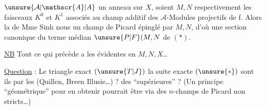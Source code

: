 
\uline{}\unsure{:|,}  $\unsure{\mathcal{A}|\mathscr{A}|A}$ un anneau sur $X$, soient $M,N$ respectivement les faisceaux $K^{0}$ et $K^{1}$ associés au champ additif des $\mathcal{A}$-Modules projectifs de  f.  Alors la  de Mme Sinh nous  un champ de Picard épinglé par $M,N$, d'où une section  canonique du terme médian $\unsure{P|F}(M,N$ de $(*)$.

\uline{NB} Tout ce qui précède a les  évidentes en $M,N,X$\ldots

\uline{Question} : Le triangle exact $(\unsure{T|J})$  la suite exacte $(\unsure{*})$ sont ils  par les  (Quillen, Breen Illusie\ldots) ?  des  ``supérieures'' ? (Un principe ``géométrique'' pour en obtenir pourrait être via des $n$-champs de Picard non  stricts\ldots)


